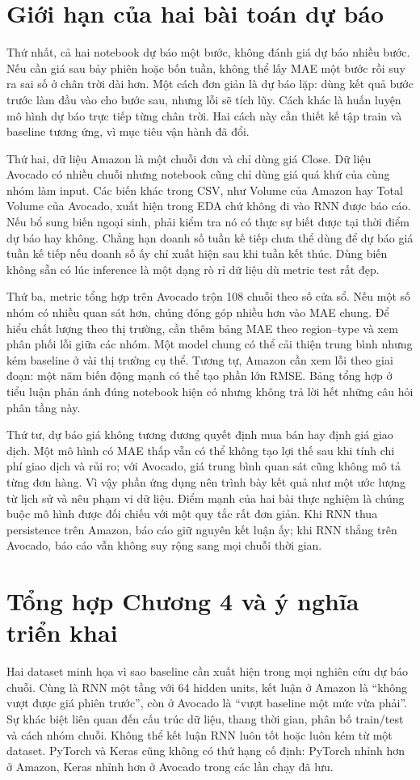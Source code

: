 \documentclass[12pt,a4paper]{report}
\begin{document}
\section{Giới hạn của hai bài toán dự báo}
Thứ nhất, cả hai notebook dự báo một bước, không đánh giá dự báo nhiều bước. Nếu cần giá sau bảy phiên hoặc bốn tuần, không thể lấy MAE một bước rồi suy ra sai số ở chân trời dài hơn. Một cách đơn giản là dự báo lặp: dùng kết quả bước trước làm đầu vào cho bước sau, nhưng lỗi sẽ tích lũy. Cách khác là huấn luyện mô hình dự báo trực tiếp từng chân trời. Hai cách này cần thiết kế tập train và baseline tương ứng, vì mục tiêu vận hành đã đổi.

Thứ hai, dữ liệu Amazon là một chuỗi đơn và chỉ dùng giá Close. Dữ liệu Avocado có nhiều chuỗi nhưng notebook cũng chỉ dùng giá quá khứ của cùng nhóm làm input. Các biến khác trong CSV, như Volume của Amazon hay Total Volume của Avocado, xuất hiện trong EDA chứ không đi vào RNN được báo cáo. Nếu bổ sung biến ngoại sinh, phải kiểm tra nó có thực sự biết được tại thời điểm dự báo hay không. Chẳng hạn doanh số tuần kế tiếp chưa thể dùng để dự báo giá tuần kế tiếp nếu doanh số ấy chỉ xuất hiện sau khi tuần kết thúc. Dùng biến không sẵn có lúc inference là một dạng rò rỉ dữ liệu dù metric test rất đẹp.

Thứ ba, metric tổng hợp trên Avocado trộn 108 chuỗi theo số cửa sổ. Nếu một số nhóm có nhiều quan sát hơn, chúng đóng góp nhiều hơn vào MAE chung. Để hiểu chất lượng theo thị trường, cần thêm bảng MAE theo region--type và xem phân phối lỗi giữa các nhóm. Một model chung có thể cải thiện trung bình nhưng kém baseline ở vài thị trường cụ thể. Tương tự, Amazon cần xem lỗi theo giai đoạn: một năm biến động mạnh có thể tạo phần lớn RMSE. Bảng tổng hợp ở tiểu luận phản ánh đúng notebook hiện có nhưng không trả lời hết những câu hỏi phân tầng này.

Thứ tư, dự báo giá không tương đương quyết định mua bán hay định giá giao dịch. Một mô hình có MAE thấp vẫn có thể không tạo lợi thế sau khi tính chi phí giao dịch và rủi ro; với Avocado, giá trung bình quan sát cũng không mô tả từng đơn hàng. Vì vậy phần ứng dụng nên trình bày kết quả như một ước lượng từ lịch sử và nêu phạm vi dữ liệu. Điểm mạnh của hai bài thực nghiệm là chúng buộc mô hình được đối chiếu với một quy tắc rất đơn giản. Khi RNN thua persistence trên Amazon, báo cáo giữ nguyên kết luận ấy; khi RNN thắng trên Avocado, báo cáo vẫn không suy rộng sang mọi chuỗi thời gian.

\section{Tổng hợp Chương 4 và ý nghĩa triển khai}
Hai dataset minh họa vì sao baseline cần xuất hiện trong mọi nghiên cứu dự báo chuỗi. Cùng là RNN một tầng với 64 hidden units, kết luận ở Amazon là ``không vượt được giá phiên trước'', còn ở Avocado là ``vượt baseline một mức vừa phải''. Sự khác biệt liên quan đến cấu trúc dữ liệu, thang thời gian, phân bố train/test và cách nhóm chuỗi. Không thể kết luận RNN luôn tốt hoặc luôn kém từ một dataset. PyTorch và Keras cũng không có thứ hạng cố định: PyTorch nhỉnh hơn ở Amazon, Keras nhỉnh hơn ở Avocado trong các lần chạy đã lưu.
\end{document}
